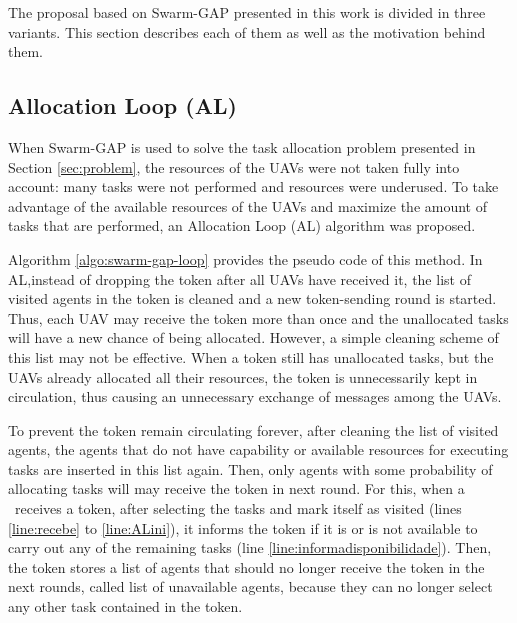The proposal based on Swarm-GAP presented in this work is divided in three variants. This section describes each of them as well as the motivation behind them.

\subsection{Allocation Loop (AL)} \label{sec:al}

When Swarm-GAP is used to solve the task allocation problem presented in Section \ref{sec:problem}, the resources of the UAVs were not taken fully into account: many tasks were not performed and resources were underused. To take advantage of the available resources of the UAVs and maximize the amount of tasks that are performed, an Allocation Loop (AL) algorithm was proposed. 

Algorithm \ref{algo:swarm-gap-loop} provides the pseudo code of this method.
In AL,instead of dropping the token after all UAVs have received it, the list of visited agents in the token is cleaned and a new token-sending round is started. Thus, each UAV may receive the token more than once and the unallocated tasks will have a new chance of being allocated.
However, a simple cleaning scheme of this list may not be effective. When a token still has unallocated tasks, but the UAVs already allocated all their resources, the token is unnecessarily kept in circulation, thus causing an unnecessary exchange of messages among the UAVs. 

To prevent the token remain circulating forever, after cleaning the list of visited agents, the agents that do not have capability or available resources for executing tasks are inserted in this list again. Then, only agents with some probability of allocating tasks will may receive the token in next round. For this, when a \uav\ receives a token, after selecting the tasks and mark itself as visited (lines \ref{line:recebe} to \ref{line:ALini}), it informs the token if it is or is not available to carry out any of the remaining tasks (line \ref{line:informadisponibilidade}). Then, the token stores a list of agents that should no longer receive the token in the next rounds, called list of unavailable agents, because they can no longer select any other task contained in the token.

